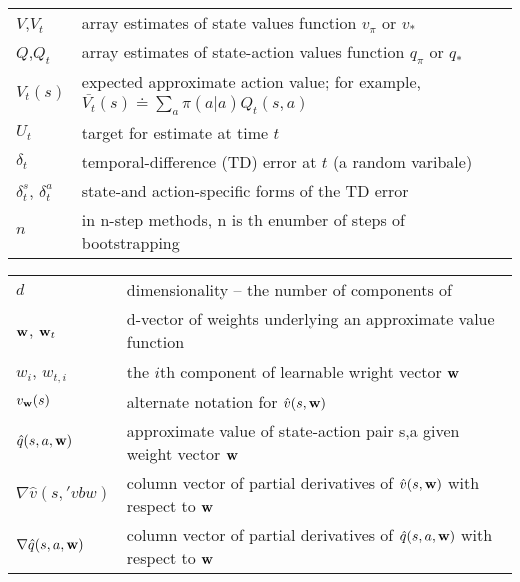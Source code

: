 \documentclass[8pt, landscape]{article}
\begin{document}
\begin{multicols}{3}
        \begin{tabular}{ p{} p{} }
            $V$,$V_t$                  & array estimates of state values function $v_\pi$ or $v_*$                                      \\
            $Q$,$Q_t$                  & array estimates of state-action values function $q_\pi$ or $q_*$                               \\
            $V_t(s)$                   & expected approximate action value; for example, $\bar{V_t}(s)\doteq \sum_{a} \pi(a|a)Q_t(s,a)$ \\
            $U_t$                      & target for estimate at time $t$                                                                \\
            $\delta_t$                 & temporal-difference (TD) error at $t$ (a random varibale)                                      \\
            $\delta_t^s$, $\delta_t^a$ & state-and action-specific forms of the TD error                                                \\
            $n$                        & in n-step methods, n is th enumber of steps of bootstrapping                                   \\
        \end{tabular}

        \begin{tabular}{ p{} p{} }
            $d$                          & dimensionality -- the number of components of                                          \\
            $\vb{w}$, $\vb{w}_t$         & d-vector of weights underlying an approximate value function                           \\
            $w_i$, $w_{t,i}$             & the $i$th component of learnable wright vector $\vb{w}$                                \\
            $v_{\vb{w}}(s)$              & alternate notation for $\hat{v}(s,\vb{w})$                                             \\
            $\hat{q}(s,a,\vb{w})$        & approximate value of state-action pair s,a given weight vector $\vb{w}$                \\
            $\nabla \hat{v}(s,'vb{w})$   & column vector of partial derivatives of $\hat{v}(s,\vb{w})$ with respect to $\vb{w}$   \\
            $\nabla \hat{q}(s,a,\vb{w})$ & column vector of partial derivatives of $\hat{q}(s,a,\vb{w})$ with respect to $\vb{w}$ \\
        \end{tabular}


\end{multicols}
\end{document}
